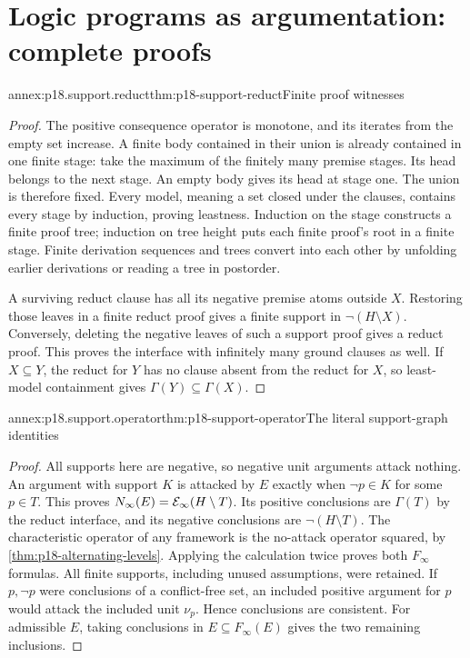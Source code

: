 \section{Logic programs as argumentation: complete proofs}
\label{sec:annex-p18-logic-program-argumentation}

\begin{annexitem}{annex:p18.support.reduct}{thm:p18-support-reduct}{Finite proof witnesses}
\begin{proof}
The positive consequence operator is monotone, and its iterates
from the empty set increase. A finite body contained in their
union is already contained in one finite stage: take the maximum
of the finitely many premise stages. Its head belongs to the
next stage. An empty body gives its head at stage one. The
union is therefore fixed. Every model, meaning a set closed
under the clauses, contains every stage by induction, proving
leastness. Induction on the stage constructs a finite proof
tree; induction on tree height puts each finite proof's root
in a finite stage. Finite derivation sequences and trees
convert into each other by unfolding earlier derivations
or reading a tree in postorder.

A surviving reduct clause has all its negative premise atoms
outside \(X\). Restoring those leaves in a finite reduct proof
gives a finite support in \(\neg(H\setminus X)\). Conversely,
deleting the negative leaves of such a support proof gives
a reduct proof. This proves the interface with infinitely
many ground clauses as well. If \(X\subseteq Y\), the
reduct for \(Y\) has no clause absent from the reduct
for \(X\), so least-model containment gives
\(\Gamma(Y)\subseteq\Gamma(X)\).
\end{proof}
\end{annexitem}

\begin{annexitem}{annex:p18.support.operator}{thm:p18-support-operator}{The literal support-graph identities}
\begin{proof}
All supports here are negative, so negative unit arguments
attack nothing. An argument with support \(K\) is attacked
by \(E\) exactly when \(\neg p\in K\) for some \(p\in T\).
This proves \(N_\infty(E)={\cal E}_\infty(H\setminus T)\).
Its positive conclusions are \(\Gamma(T)\) by the reduct
interface, and its negative conclusions are
\(\neg(H\setminus T)\). The characteristic operator of
any framework is the no-attack operator squared, by
\cref{thm:p18-alternating-levels}. Applying the calculation
twice proves both \(F_\infty\) formulas. All finite
supports, including unused assumptions, were retained.
If \(p,\neg p\) were conclusions of a conflict-free
set, an included positive argument for \(p\) would
attack the included unit \(\nu_p\). Hence conclusions
are consistent. For admissible \(E\), taking conclusions
in \(E\subseteq F_\infty(E)\) gives the two remaining
inclusions.
\end{proof}
\end{annexitem}

